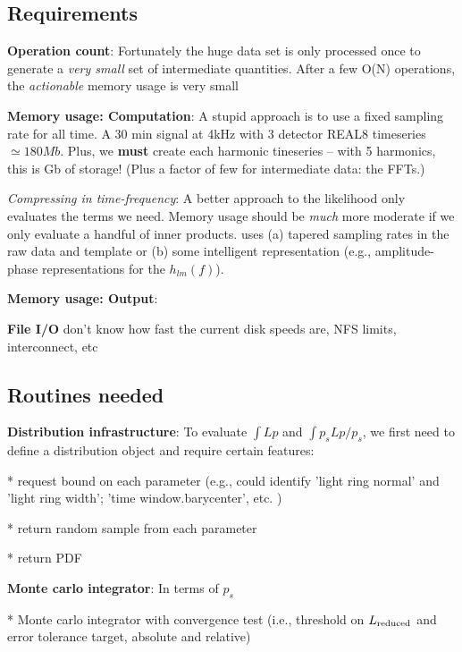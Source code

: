 \documentclass[twocolumn,prd,nofootinbib]{revtex4}
\newcommand\editremark[1]{{\color{red} #1}}
\begin{document}
\subsection{Requirements}


\noindent \textbf{Operation count}: Fortunately the huge data set is only processed once to generate a \emph{very small}
set of intermediate quantities.  After a few O(N) operations, the \emph{actionable} memory usage is very small


\noindent \textbf{Memory usage: Computation}: A stupid approach is to use a fixed sampling rate for all time.
%
A 30 min signal at 4kHz with 3 detector REAL8 timeseries $\simeq 180 Mb$.
Plus, we \textbf{must} create each harmonic tineseries -- with 5 harmonics, this is Gb of storage!  (Plus a factor of few for intermediate
data: the FFTs.)

\noindent \emph{Compressing in time-frequency}: A better approach to the likelihood only evaluates the terms we need.
Memory usage should be \emph{much} more moderate if we only evaluate a handful of inner products. uses (a) tapered sampling rates in
the raw data and template or (b) some intelligent representation (e.g., amplitude-phase representations for the $h_{lm}(f)$).

\noindent \textbf{Memory usage: Output}: 

\noindent \textbf{File I/O} \editremark{don't know} how fast the current disk speeds are, NFS limits, interconnect, etc


\subsection{Routines needed}

\noindent \textbf{Distribution infrastructure}: To evaluate $\int L p$ and $\int p_s L p/p_s$, we first need to define
a distribution object and require certain features:

* request bound on each parameter (e.g., could identify 'light ring normal' and 'light ring width'; 'time
window.barycenter', etc. )

* return random sample from each parameter

* return PDF


\noindent \textbf{Monte carlo integrator}: In terms of $p_s$

* Monte carlo integrator with convergence test (i.e., threshold on $L_{\rm reduced}$ and error tolerance target,
absolute and relative)
\end{document}
